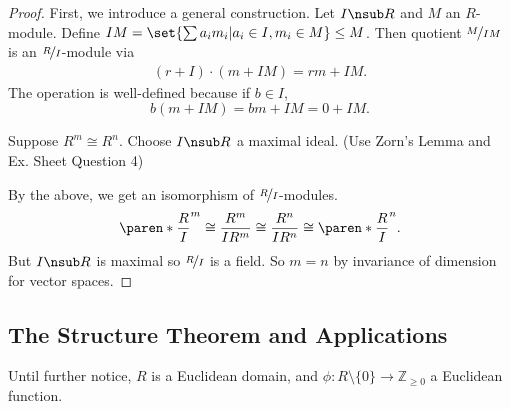 \begin{proof}
    First, we introduce a general construction. Let \(I \nsub R\) and \(M\) an \(R\)-module. Define \(IM = \set{\sum a_i m_i | a_i \in I, m_i \in M} \leq M\). Then quotient \(\nicefrac{M}{IM}\) is an \(\nicefrac{R}{I}\)-module via
    \begin{align*}
        (r + I)\cdot (m + IM) = rm + IM.
    \end{align*}
    The operation is well-defined because if \(b \in I\),
    \[
        b(m + IM) = bm + IM = 0 + IM.
    \]

    Suppose \(R^m \cong R^n\). Choose \(I \nsub R\) a maximal ideal. (Use Zorn's Lemma and Ex. Sheet Question 4)

    By the above, we get an isomorphism of \(\nicefrac{R}{I}\)-modules.
    \[
        \paren*{\frac{R}{I}}^m \cong \frac{R^m}{IR^m}\cong \frac{R^n}{IR^n} \cong \paren*{\frac{R}{I}}^n.
    \]
    But \(I \nsub R\) is maximal so \(\nicefrac{R}{I}\) is a field. So \(m = n\) by invariance of dimension for vector spaces.
\end{proof}
\subsection{The Structure Theorem and Applications}
Until further notice, \(R\) is a Euclidean domain, and \(\phi: R \setminus \{0\} \to \mathbb{Z}_{\geq 0}\) a Euclidean function.


